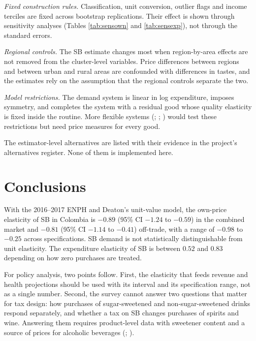 \documentclass[
  11pt,
]{article}
\begin{document}
\emph{Fixed construction rules.} Classification, unit conversion,
outlier flags and income terciles are fixed across bootstrap
replications. Their effect is shown through sensitivity analyses (Tables
\ref{tab:sensown} and \ref{tab:sensexp}), not through the standard
errors.

\emph{Regional controls.} The SB estimate changes most when
region-by-area effects are not removed from the cluster-level variables.
Price differences between regions and between urban and rural areas are
confounded with differences in tastes, and the estimates rely on the
assumption that the regional controls separate the two.

\emph{Model restrictions.} The demand system is linear in log
expenditure, imposes symmetry, and completes the system with a residual
good whose quality elasticity is fixed inside the routine. More flexible
systems (; ; ) would test these restrictions but need price measures for every
good.

The estimator-level alternatives are listed with their evidence in the
project's alternatives register. None of them is implemented here.

\section{Conclusions}\label{conclusions}

With the 2016--2017 ENPH and Deaton's unit-value model, the own-price
elasticity of SB in Colombia is \(-0.89\) (95\% CI \(-1.24\) to
\(-0.59\)) in the combined market and \(-0.81\) (95\% CI \(-1.14\) to
\(-0.41\)) off-trade, with a range of \(-0.98\) to \(-0.25\) across
specifications. SB demand is not statistically distinguishable from unit
elasticity. The expenditure elasticity of SB is between \(0.52\) and
\(0.83\) depending on how zero purchases are treated.

For policy analysis, two points follow. First, the elasticity that feeds
revenue and health projections should be used with its interval and its
specification range, not as a single number. Second, the survey cannot
answer two questions that matter for tax design: how purchases of
sugar-sweetened and non-sugar-sweetened drinks respond separately, and
whether a tax on SB changes purchases of spirits and wine. Answering
them requires product-level data with sweetener content and a source of
prices for alcoholic beverages
(;
).
\end{document}
